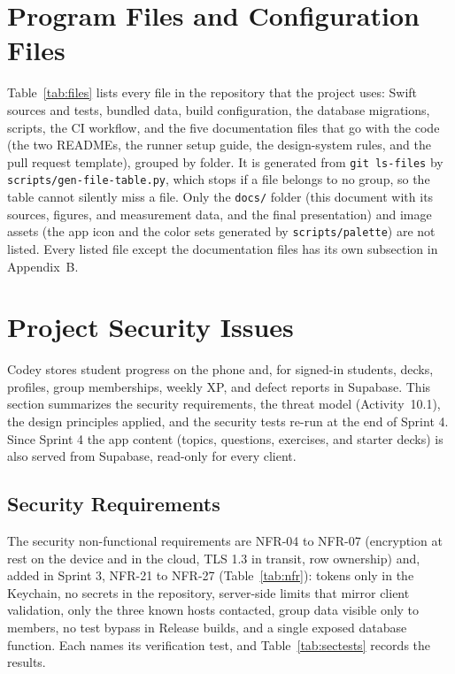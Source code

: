 \documentclass[12pt,letterpaper]{article}
\begin{document}
\section{Program Files and Configuration Files}\label{sec:files}
Table~\ref{tab:files} lists every file in the repository that the project uses:
Swift sources and tests, bundled data, build configuration, the database migrations,
scripts, the CI workflow, and the five documentation files that go with the code (the two
READMEs, the runner setup guide, the design-system rules, and the pull request template), grouped by folder.
It is generated from \texttt{git ls-files} by \texttt{scripts/gen-file-table.py},
which stops if a file belongs to no group, so the table cannot silently miss a file.
Only the \texttt{docs/} folder (this document with its sources, figures, and
measurement data, and the final presentation) and image assets (the app icon and the
color sets generated by \texttt{scripts/palette}) are not listed. Every listed file except
the documentation files has its own subsection in Appendix~B.

{\singlespacing\footnotesize
{}
}

\section{Project Security Issues}\label{sec:security}
Codey stores student progress on the phone and, for signed-in students, decks,
profiles, group memberships, weekly XP, and defect reports in Supabase. This section
summarizes the security requirements, the threat model (Activity~10.1), the design
principles applied, and the security tests re-run at the end of Sprint 4. Since
Sprint 4 the app content (topics, questions, exercises, and starter decks) is also
served from Supabase, read-only for every client.

\subsection{Security Requirements}
The security non-functional requirements are NFR-04 to NFR-07 (encryption at rest on
the device and in the cloud, TLS 1.3 in transit, row ownership) and, added in
Sprint 3, NFR-21 to NFR-27 (Table~\ref{tab:nfr}): tokens only in the Keychain, no
secrets in the repository, server-side limits that mirror client validation, only the
three known hosts contacted, group data visible only to members, no test bypass in
Release builds, and a single exposed database function. Each names its verification
test, and Table~\ref{tab:sectests} records the results.
\end{document}
